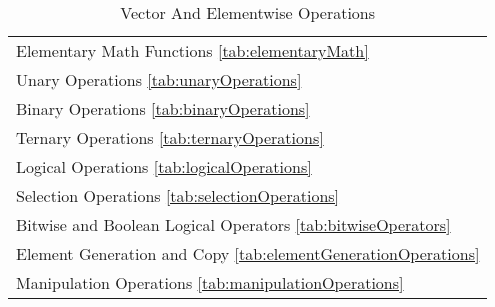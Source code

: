 \begin{table}[H]
\caption{Vector And Elementwise Operations}
\label{tab:elementwiseChapter}
\begin{center}
\begin{tabular}{|l|}\hline
Elementary Math Functions \ref{tab:elementaryMath}\\
Unary Operations \ref{tab:unaryOperations}\\
Binary Operations \ref{tab:binaryOperations}\\
Ternary Operations \ref{tab:ternaryOperations}\\
Logical Operations \ref{tab:logicalOperations}\\
Selection Operations \ref{tab:selectionOperations}\\
Bitwise and Boolean Logical Operators \ref{tab:bitwiseOperators}\\
Element Generation and Copy \ref{tab:elementGenerationOperations}\\
Manipulation Operations \ref{tab:manipulationOperations}\\
\hline\end{tabular}
\end{center}
\label{default}
\end{table}%